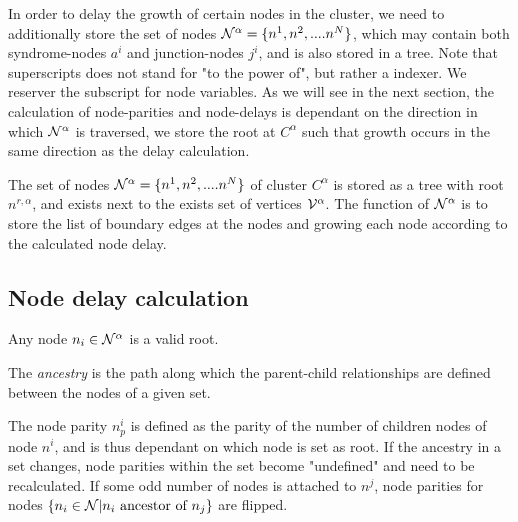 

In order to delay the growth of certain nodes in the cluster, we need to additionally store the set of nodes $\mathcal{N}^\alpha = \{n^1, n^2, .... n^N\}$, which may contain both syndrome-nodes $a^i$ and junction-nodes $j^i$, and is also stored in a tree. Note that superscripts does not stand for "to the power of", but rather a indexer. We reserver the subscript for node variables. As we will see in the next section, the calculation of node-parities and node-delays is dependant on the direction in which $\mathcal{N}^\alpha$ is traversed, we store the root at $C^\alpha$ such that growth occurs in the same direction as the delay calculation.

\begin{theorem}
  The set of nodes $\mathcal{N}^\alpha = \{n^1, n^2, .... n^N\}$ of cluster $C^\alpha$ is stored as a tree with root $n^{r, \alpha}$, and exists next to the exists set of vertices $\mathcal{V}^\alpha$. The function of $\mathcal{N}^\alpha$ is to store the list of boundary edges at the nodes and growing each node according to the calculated node delay.
\end{theorem}


\subsection{Node delay calculation}


\begin{lemma}
  Any node $n_i \in \mathcal{N}^\alpha$ is a valid root.
\end{lemma}


The \emph{ancestry} is the path along which the parent-child relationships are defined between the nodes of a given set.

\begin{lemma}\label{lem:nodecalc_parity}
  The node parity $n^i_p$ is defined as the parity of the number of children nodes of node $n^i$, and is thus dependant on which node is set as root. If the ancestry in a set changes, node parities within the set become "undefined" and need to be recalculated. If some odd number of nodes is attached to $n^j$, node parities for nodes $\{n_i \in \mathcal{N} | n_i \mbox{ ancestor of } n_j\}$ are flipped.   
\end{lemma}


